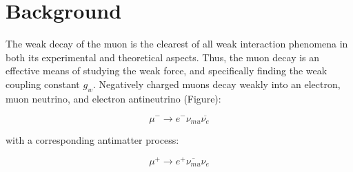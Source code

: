
\section{Background}

The weak decay of the muon is the clearest of all weak interaction
phenomena in both its experimental and theoretical aspects. Thus, the muon
decay is an effective means of studying the weak force, and
specifically finding the weak coupling constant $g_w$. Negatively
charged muons decay weakly into an electron, muon neutrino, and
electron antineutrino (Figure):

\begin{equation}\mu^- \rightarrow e^- \nu_{mu}\overline{\nu_e}\end{equation}

with a corresponding antimatter process:

\begin{equation}\mu^+ \rightarrow e^+ \overline{\nu_{mu}}{\nu_e}\end{equation}

